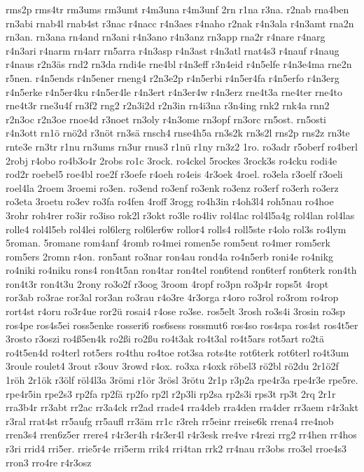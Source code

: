 {rms2p
rms4tr
rm3ums
rm3umt
r4m3una
r4m3unf
2rn
r1na
r3na.
r2nab
rna4ben
rn3abi
rnab4l
rnab4st
r3nac
r4nacc
r4n3aes
r4naho
r2nak
r4n3ala
r4n3amt
rna2n
rn3an.
rn3ana
rn4and
rn3ani
r4n3ano
r4n3anz
rn3app
rna2r
r4nare
r4narg
r4n3ari
r4narm
rn4arr
rn5arra
r4n3asp
r4n3ast
r4n3atl
rnat4s3
r4nauf
r4naug
r4naus
r2n3äs
rnd2
rn3da
rndi4e
rne4bl
r4n3eff
r3n4eid
r4n5elfe
r4n3e4ma
rne2n
r5nen.
r4n5ends
r4n5ener
rneng4
r2n3e2p
r4n5erbi
r4n5er4fa
r4n5erfo
r4n3erg
r4n5erke
r4n5er4ku
r4n5er4le
r4n3ert
r4n3er4w
r4n3erz
rne4t3a
rne4ter
rne4to
rne4t3r
rne3u4f
rn3f2
rng2
r2n3i2d
r2n3in
rn4i3na
r3n4ing
rnk2
rnk4a
rnn2
r2n3oc
r2n3oe
rnoe4d
r3noet
rn3oly
r4n3ome
rn3opf
rn3orc
rn5ost.
rn5osti
r4n3ott
rn1ö
rnö2d
r3nöt
rn3sä
rnsch4
rnse4h5a
rn3s2k
rn3s2l
rns2p
rns2z
rn3te
rnte3e
rn3tr
r1nu
rn3ums
rn3ur
rnus3
r1nü
r1ny
rn3z2
1ro.
ro3adr
r5oberf
ro4berl
2robj
r4obo
ro4b3o4r
2robs
ro1c
3rock.
ro4ckel
5rockes
3rock3s
ro4cku
rodi4e
rod2r
roebel5
roe4bl
roe2f
r3oefe
r4oeh
ro4eis
4r3oek
4roel.
ro3ela
r3oelf
r3oeli
roel4la
2roem
3roemi
ro3en.
ro3end
ro3enf
ro3enk
ro3enz
ro3erf
ro3erh
ro3erz
ro3eta
3roetu
ro3ev
ro3fa
ro4fen
4roff
3rogg
ro4h3in
r4oh3l4
roh5nau
ro4hoe
3rohr
roh4rer
ro3ir
ro3iso
rok2l
r3okt
ro3le
ro4liv
rol4lac
rol4l5a4g
rol4lan
rol4las
rolle4
rol4l5eb
rol4lei
rol6lerg
rol6ler6w
rollor4
rolls4
roll5ste
r4olo
rol3s
ro4lym
5roman.
5romane
rom4anf
4romb
ro4mei
romen5e
rom5ent
ro4mer
rom5erk
rom5ers
2romn
r4on.
ron5ant
ro3nar
ron4au
rond4a
ro4n5erb
roni4e
ro4nikg
ro4niki
ro4niku
rons4
ron4t5an
ron4tar
ron4tel
ron6tend
ron6terf
ron6terk
ron4th
ron4t3r
ron4t3u
2rony
ro3o2f
r3oog
3room
4ropf
ro3pn
ro3p4r
rops5t
4ropt
ror3ab
ro3rae
ror3al
ror3an
ro3rau
r4o3re
4r3orga
r4oro
ro3rol
ro3rom
ro4rop
rort4st
r4oru
ro3r4ue
ror2ü
rosai4
r4ose
ro3se.
ros5elt
3rosh
ro3s4i
3rosin
ro3sp
ros4pe
ros4s5ei
ross5enke
rosseri6
ros6sess
rossmut6
ros4so
ros4spa
ros4st
ros4t5er
3rosto
r3oszi
ro4ß5en4k
ro2ßi
ro2ßu
ro4t3ak
ro4t3al
ro4t5ars
rot5art
ro2tä
ro4t5en4d
ro4terl
rot5ers
ro4thu
ro4toe
rot3sa
rots4te
rot6terk
rot6terl
ro4t3um
3roule
roulet4
3rout
r3ouv
3rowd
r4ox.
ro3xa
r4oxk
röbel3
rö2bl
rö2du
2r1ö2f
1röh
2r1ök
r3ölf
röl4l3a
3römi
r1ör
3rösl
3rötu
2r1p
r3p2a
rpe4r3a
rpe4r3e
rpe5re.
rpe4r5in
rpe2s3
rp2fa
rp2fä
rp2fo
rp2l
r2p3li
rp2sa
rp2s3i
rps3t
rp3t
2rq
2r1r
rra3b4r
rr3abt
rr2ac
rr3a4ck
rr2ad
rrade4
rra4deb
rra4den
rra4der
rr3aem
r4r3akt
r3ral
rrat4st
rr5aufg
rr5aufl
rr3äm
rr1c
r3reh
rr5einr
rreise6k
rrena4
rre4nob
rren3s4
rren6z5er
rrere4
r4r3er4h
r4r3er4l
r4r3esk
rre4ve
r4rezi
rrg2
rr4hen
rr4hos
r3ri
rrid4
rri5er.
rrie5r4e
rri5erm
rrik4
rri4tan
rrk2
rr4nau
rr3obs
rro3el
rroe4s3
rron3
rro4re
r4r3osz
}
